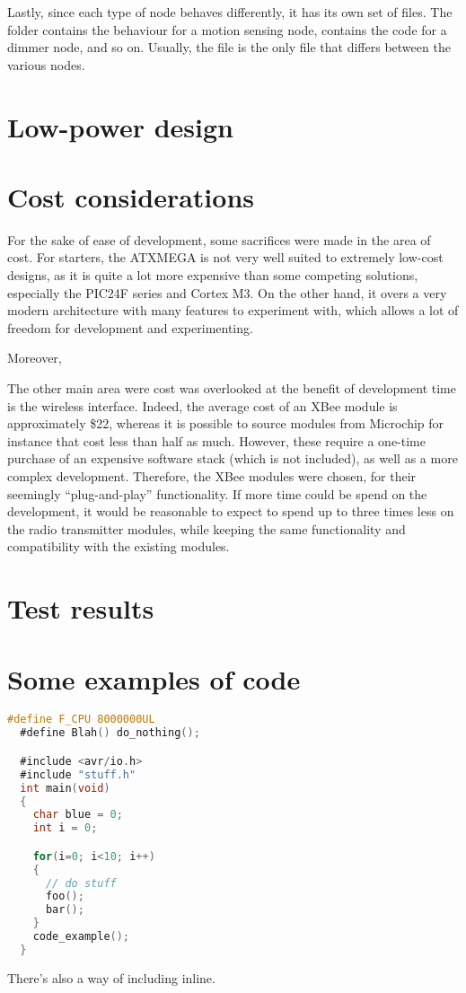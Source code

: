 Lastly, since each type of node behaves differently, it has its own set of
files. The  folder contains the behaviour for a motion
sensing node,  contains the code for a dimmer node, and so
on. Usually, the  file is the only file that differs between the
various nodes.

\section{Low-power design}

\section{Cost considerations}

For the sake of ease of development, some sacrifices were made in the area of
cost. For starters, the ATXMEGA is not very well suited to extremely low-cost
designs, as it is quite a lot more expensive than some competing solutions,
especially the PIC24F series and Cortex M3. On the other hand, it overs a very
modern architecture with many features to experiment with, which allows a lot of
freedom for development and experimenting.

Moreover,

The other main area were cost was overlooked at the benefit of development time
is the wireless interface. Indeed, the average cost of an XBee module is
approximately \$22, whereas it is possible to source modules from Microchip for
instance that cost less than half as much. However, these require a one-time
purchase of an expensive software stack (which is not included), as well as a
more complex development. Therefore, the XBee modules were chosen, for their
seemingly ``plug-and-play'' functionality. If more time could be spend on the
development, it would be reasonable to expect to spend up to three times less on
the radio transmitter modules, while keeping the same functionality and
compatibility with the existing modules.

\section{Test results}

\section{Some examples of code}
\begin{lstlisting}[language=C]
  #define F_CPU 8000000UL
  #define Blah() do_nothing();

  #include <avr/io.h>
  #include "stuff.h"
  int main(void)
  {
    char blue = 0;
    int i = 0;

    for(i=0; i<10; i++)
    {
      // do stuff
      foo();
      bar();
    }
    code_example();
  }
\end{lstlisting}

There's also a way of including  inline.




